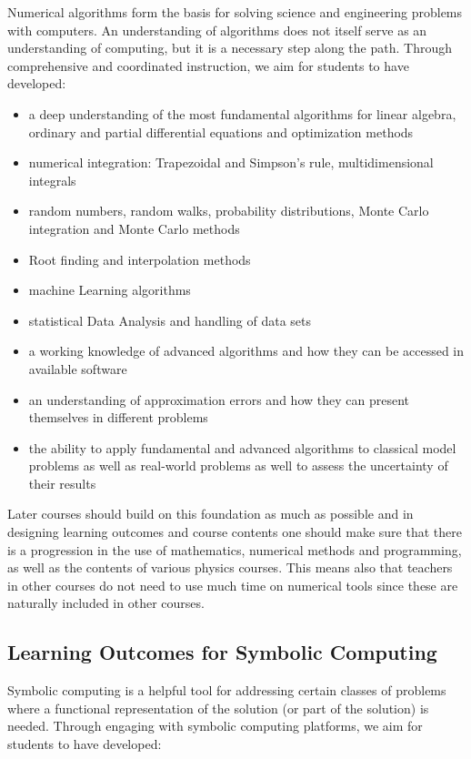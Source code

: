 \documentclass[graybox,envcountchap,sectrefs]{svmult}
\begin{document}
Numerical algorithms form the basis for solving science and
engineering problems with computers. An understanding of algorithms
does not itself serve as an understanding of computing, but it is a
necessary step along the path. Through comprehensive and coordinated
instruction, we aim for students to have developed:

\begin{itemize}
\item a deep understanding of the most fundamental algorithms for linear algebra, ordinary and partial differential equations and optimization methods

\item numerical integration: Trapezoidal and Simpson's rule, multidimensional integrals

\item random numbers, random walks, probability distributions, Monte Carlo integration and Monte Carlo methods

\item Root finding and interpolation methods

\item machine Learning algorithms

\item statistical Data Analysis and handling of data sets

\item a working knowledge of advanced algorithms and how they can be accessed in available software

\item an understanding of approximation errors and how they can present themselves in different problems

\item the ability to apply fundamental and advanced algorithms to classical model problems as well as real-world problems as well to assess the uncertainty of their results
\end{itemize}


Later courses should build on this foundation as much as possible and
in designing learning outcomes and course contents one should make
sure that there is a progression in the use of mathematics, numerical
methods and programming, as well as the contents of various physics
courses.  This means also that teachers in other courses do not need
to use much time on numerical tools since these are naturally included
in other courses.



\subsection{Learning Outcomes for Symbolic Computing}
Symbolic computing  is a helpful tool for addressing certain classes of
problems where a functional representation of the solution (or part of
the solution) is needed. Through engaging with symbolic computing
platforms, we aim for students to have developed:
\end{document}
